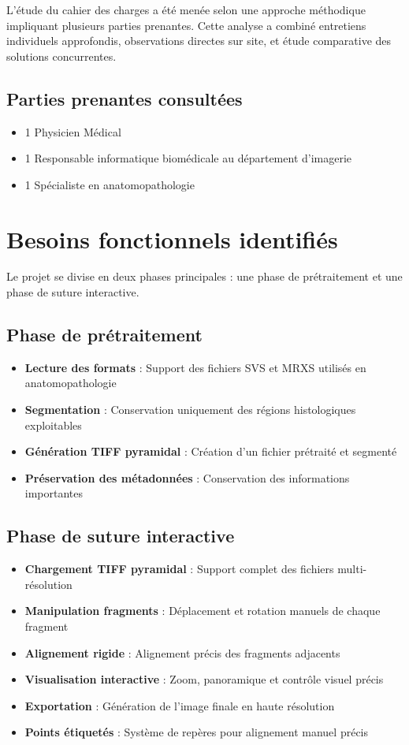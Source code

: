 \documentclass[11pt,a4paper]{report}
\begin{document}
L'étude du cahier des charges a été menée selon une approche méthodique impliquant plusieurs parties prenantes. Cette analyse a combiné entretiens individuels approfondis, observations directes sur site, et étude comparative des solutions concurrentes.

\subsection{Parties prenantes consultées}

\begin{itemize}
\item 1 Physicien Médical
\item 1 Responsable informatique biomédicale au département d'imagerie
\item 1 Spécialiste en anatomopathologie
\end{itemize}

\section{Besoins fonctionnels identifiés}

Le projet se divise en deux phases principales : une phase de prétraitement et une phase de suture interactive.

\subsection{Phase de prétraitement}

\begin{itemize}
\item \textbf{Lecture des formats} : Support des fichiers SVS et MRXS utilisés en anatomopathologie
\item \textbf{Segmentation} : Conservation uniquement des régions histologiques exploitables
\item \textbf{Génération TIFF pyramidal} : Création d'un fichier prétraité et segmenté
\item \textbf{Préservation des métadonnées} : Conservation des informations importantes
\end{itemize}

\subsection{Phase de suture interactive}

\begin{itemize}
\item \textbf{Chargement TIFF pyramidal} : Support complet des fichiers multi-résolution
\item \textbf{Manipulation fragments} : Déplacement et rotation manuels de chaque fragment
\item \textbf{Alignement rigide} : Alignement précis des fragments adjacents
\item \textbf{Visualisation interactive} : Zoom, panoramique et contrôle visuel précis
\item \textbf{Exportation} : Génération de l'image finale en haute résolution
\item \textbf{Points étiquetés} : Système de repères pour alignement manuel précis
\end{itemize}
\end{document}
